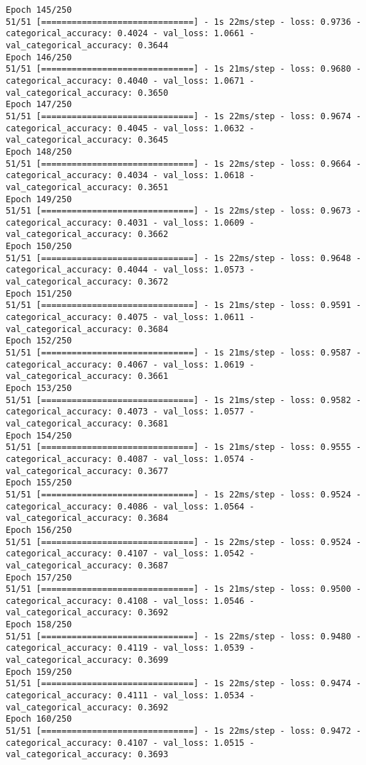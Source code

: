 \begin{lstlisting}
Epoch 145/250
51/51 [==============================] - 1s 22ms/step - loss: 0.9736 - categorical_accuracy: 0.4024 - val_loss: 1.0661 - val_categorical_accuracy: 0.3644
Epoch 146/250
51/51 [==============================] - 1s 21ms/step - loss: 0.9680 - categorical_accuracy: 0.4040 - val_loss: 1.0671 - val_categorical_accuracy: 0.3650
Epoch 147/250
51/51 [==============================] - 1s 22ms/step - loss: 0.9674 - categorical_accuracy: 0.4045 - val_loss: 1.0632 - val_categorical_accuracy: 0.3645
Epoch 148/250
51/51 [==============================] - 1s 22ms/step - loss: 0.9664 - categorical_accuracy: 0.4034 - val_loss: 1.0618 - val_categorical_accuracy: 0.3651
Epoch 149/250
51/51 [==============================] - 1s 22ms/step - loss: 0.9673 - categorical_accuracy: 0.4031 - val_loss: 1.0609 - val_categorical_accuracy: 0.3662
Epoch 150/250
51/51 [==============================] - 1s 22ms/step - loss: 0.9648 - categorical_accuracy: 0.4044 - val_loss: 1.0573 - val_categorical_accuracy: 0.3672
Epoch 151/250
51/51 [==============================] - 1s 21ms/step - loss: 0.9591 - categorical_accuracy: 0.4075 - val_loss: 1.0611 - val_categorical_accuracy: 0.3684
Epoch 152/250
51/51 [==============================] - 1s 21ms/step - loss: 0.9587 - categorical_accuracy: 0.4067 - val_loss: 1.0619 - val_categorical_accuracy: 0.3661
Epoch 153/250
51/51 [==============================] - 1s 21ms/step - loss: 0.9582 - categorical_accuracy: 0.4073 - val_loss: 1.0577 - val_categorical_accuracy: 0.3681
Epoch 154/250
51/51 [==============================] - 1s 21ms/step - loss: 0.9555 - categorical_accuracy: 0.4087 - val_loss: 1.0574 - val_categorical_accuracy: 0.3677
Epoch 155/250
51/51 [==============================] - 1s 22ms/step - loss: 0.9524 - categorical_accuracy: 0.4086 - val_loss: 1.0564 - val_categorical_accuracy: 0.3684
Epoch 156/250
51/51 [==============================] - 1s 22ms/step - loss: 0.9524 - categorical_accuracy: 0.4107 - val_loss: 1.0542 - val_categorical_accuracy: 0.3687
Epoch 157/250
51/51 [==============================] - 1s 21ms/step - loss: 0.9500 - categorical_accuracy: 0.4108 - val_loss: 1.0546 - val_categorical_accuracy: 0.3692
Epoch 158/250
51/51 [==============================] - 1s 22ms/step - loss: 0.9480 - categorical_accuracy: 0.4119 - val_loss: 1.0539 - val_categorical_accuracy: 0.3699
Epoch 159/250
51/51 [==============================] - 1s 22ms/step - loss: 0.9474 - categorical_accuracy: 0.4111 - val_loss: 1.0534 - val_categorical_accuracy: 0.3692
Epoch 160/250
51/51 [==============================] - 1s 22ms/step - loss: 0.9472 - categorical_accuracy: 0.4107 - val_loss: 1.0515 - val_categorical_accuracy: 0.3693

\end{lstlisting}
